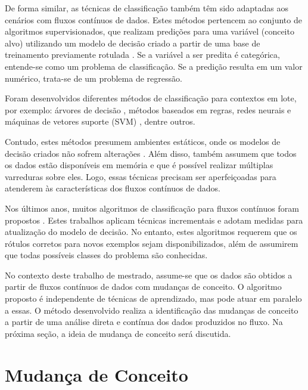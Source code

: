 \documentclass[qual, classic, a4paper]{ufbathesis}
\begin{document}
De forma similar, as técnicas de classificação também têm sido adaptadas aos cenários com fluxos contínuos de dados.
Estes métodos pertencem ao conjunto de algoritmos supervisionados, 
que realizam predições para uma variável (conceito alvo) utilizando um modelo de decisão criado a partir de uma base de treinamento previamente rotulada \cite{Kotsiantis:2007:SML:1566770.1566773}.
Se a variável a ser predita é categórica, entende-se como um problema de classificação.
Se a predição resulta em um valor numérico, trata-se de um problema de regressão.

Foram desenvolvidos diferentes métodos de classificação para contextos em lote, por exemplo:
árvores de decisão \cite{Breiman:Classification_Regression_Trees},
métodos baseados em regras, 
redes neurais e máquinas de vetores suporte (SVM) \cite{Vapnik1998}, 
dentre outros.

Contudo, estes métodos presumem ambientes estáticos, onde os modelos de decisão criados não sofrem alterações \cite{Aggarwal:2006:DSM:1196418}.
Além disso, também assumem que todos os dados estão disponíveis em memória e que é possível realizar múltiplas varreduras sobre eles.
Logo, essas técnicas precisam ser aperfeiçoadas para atenderem às características dos fluxos contínuos de dados.

Nos últimos anos, muitos algoritmos de classificação para fluxos contínuos foram propostos 
\cite{Domingos:2000:MHD:347090.347107, Bifet:2013:EDS:2480362.2480516, Wang:2003:MCD:956750.956778, Aggarwal:2004:DCD:1014052.1014110, Gama:2003:ADT:956750.956813}.
Estes trabalhos aplicam técnicas incrementais e adotam medidas para atualização do modelo de decisão.
No entanto, estes algoritmos requerem que os rótulos corretos para novos exemplos sejam disponibilizados, 
além de assumirem que todas possíveis classes do problema são conhecidas.

No contexto deste trabalho de mestrado, assume-se que os dados são obtidos a partir de fluxos contínuos de dados com mudanças de conceito.
O algoritmo proposto é independente de técnicas de aprendizado, mas pode atuar em paralelo a essas.
O método desenvolvido realiza a identificação das mudanças de conceito a partir de uma análise direta e contínua dos dados produzidos no fluxo.
Na próxima seção, a ideia de mudança de conceito será discutida.

\section{Mudança de Conceito}
\end{document}
